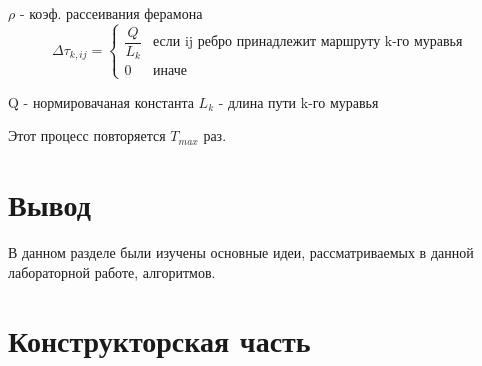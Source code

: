 \documentclass[12pt]{report}
\begin{document}
	$\rho$ - коэф. рассеивания ферамона
	\begin{displaymath}
	\Delta\tau_{k,ij} = \left\{ \begin{array}{ll}
	\dfrac{Q}{L_{k}}
	& \textrm{если ij ребро принадлежит маршруту k-го муравья}\\ 
	0 & \textrm{иначе}
	\end{array} \right.
	\end{displaymath}
	
	Q - нормировачаная константа
	$L_{k}$ - длина пути k-го муравья

	Этот процесс повторяется $T_{max}$ раз.
	
	\chapter*{Вывод}
	
	В данном разделе были изучены основные идеи, рассматриваемых в данной лабораторной работе, алгоритмов.
	
	\chapter{Конструкторская часть}
\end{document}
